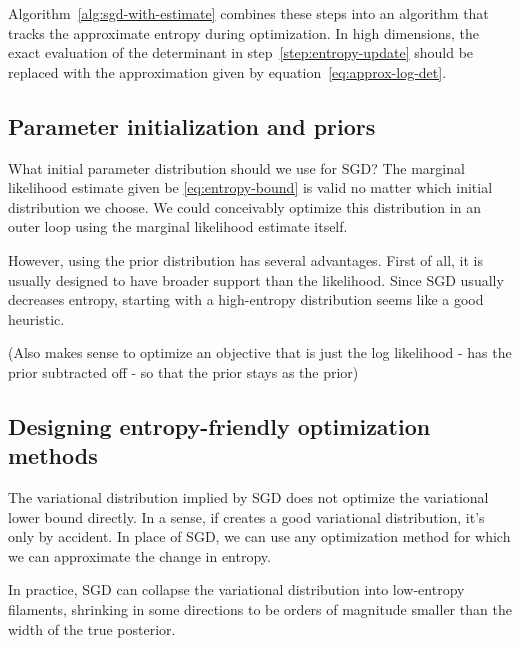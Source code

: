 \documentclass[]{article}
\begin{document}
Algorithm~\ref{alg:sgd-with-estimate} combines these steps into an algorithm that tracks the approximate entropy during optimization.
In high dimensions, the exact evaluation of the determinant in step~\ref{step:entropy-update} should be replaced with the approximation given by equation~\eqref{eq:approx-log-det}.


\subsection{Parameter initialization and priors}

What initial parameter distribution should we use for SGD?
The marginal likelihood estimate given be \eqref{eq:entropy-bound} is valid no matter which initial distribution we choose.
We could conceivably optimize this distribution in an outer loop using the marginal likelihood estimate itself.

However, using the prior distribution has several advantages.
First of all, it is usually designed to have broader support than the likelihood.
Since SGD usually decreases entropy, starting with a high-entropy distribution seems like a good heuristic.

(Also makes sense to optimize an
objective that is just the log likelihood - has the prior subtracted off - so
that the prior stays as the prior)


\subsection{Designing entropy-friendly optimization methods}

The variational distribution implied by SGD does not optimize the variational lower bound directly.
In a sense, if creates a good variational distribution, it's only by accident.
In place of SGD, we can use any optimization method for which we can approximate the change in entropy.

In practice, SGD can collapse the variational distribution into low-entropy filaments, shrinking in some directions to be orders of magnitude smaller than the width of the true posterior.
\end{document}
